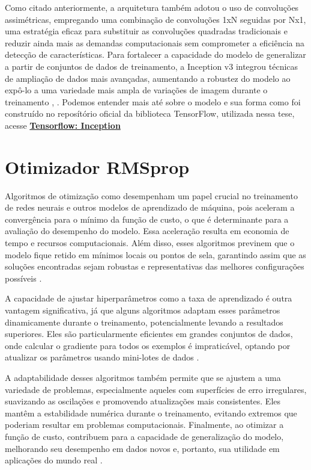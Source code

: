 Como citado anteriormente, a arquitetura também adotou o uso de convoluções assimétricas, empregando uma combinação de convoluções 1xN seguidas por Nx1, uma estratégia eficaz para substituir as convoluções quadradas tradicionais e reduzir ainda mais as demandas computacionais sem comprometer a eficiência na detecção de características. Para fortalecer a capacidade do modelo de generalizar a partir de conjuntos de dados de treinamento, a Inception v3 integrou técnicas de ampliação de dados mais avançadas, aumentando a robustez do modelo ao expô-lo a uma variedade mais ampla de variações de imagem durante o treinamento \cite{7298594}, \cite{Szegedy2016RethinkingTI}. Podemos entender mais até sobre o modelo e sua forma como foi construído no reposítório oficial da biblioteca TensorFlow, utilizada nessa tese, acesse \href{https://github.com/tensorflow/tpu/tree/master/models/experimental/inception}{\textbf{Tensorflow: Inception}}



\section{Otimizador RMSprop}

Algoritmos de otimização como desempenham um papel crucial no treinamento de redes neurais e outros modelos de aprendizado de máquina, pois aceleram a convergência para o mínimo da função de custo, o que é determinante para a avaliação do desempenho do modelo. Essa aceleração resulta em economia de tempo e recursos computacionais. Além disso, esses algoritmos previnem que o modelo fique retido em mínimos locais ou pontos de sela, garantindo assim que as soluções encontradas sejam robustas e representativas das melhores configurações possíveis \cite{Watt2016MachineLearning}. 

A capacidade de ajustar hiperparâmetros como a taxa de aprendizado é outra vantagem significativa, já que alguns algoritmos adaptam esses parâmetros dinamicamente durante o treinamento, potencialmente levando a resultados superiores. Eles são particularmente eficientes em grandes conjuntos de dados, onde calcular o gradiente para todos os exemplos é impraticável, optando por atualizar os parâmetros usando mini-lotes de dados \cite{Watt2016MachineLearning}.

A adaptabilidade desses algoritmos também permite que se ajustem a uma variedade de problemas, especialmente aqueles com superfícies de erro irregulares, suavizando as oscilações e promovendo atualizações mais consistentes. Eles mantêm a estabilidade numérica durante o treinamento, evitando extremos que poderiam resultar em problemas computacionais. Finalmente, ao otimizar a função de custo, contribuem para a capacidade de generalização do modelo, melhorando seu desempenho em dados novos e, portanto, sua utilidade em aplicações do mundo real \cite{Watt2016MachineLearning}.

